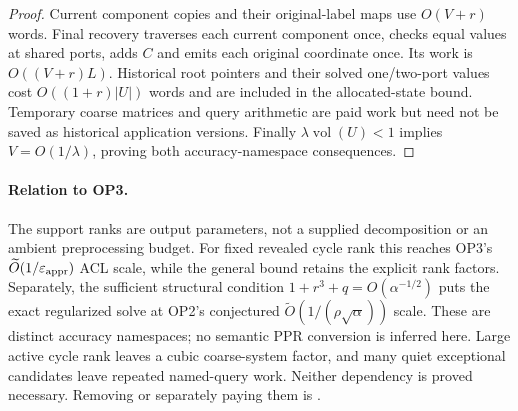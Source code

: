 \begin{proof}
Current component copies and their original-label maps use $O(V+r)$ words.
Final recovery traverses each current component once, checks equal values
at shared ports, adds $C$ and emits each original coordinate once. Its work
is $O((V+r)L)$. Historical root pointers and their solved one/two-port
values cost $O((1+r)|U|)$ words and are included in the allocated-state
bound. Temporary coarse matrices and query arithmetic are paid work but
need not be saved as historical application versions. Finally
$\lambda\operatorname{vol}(U)<1$ implies $V=O(1/\lambda)$, proving both
accuracy-namespace consequences.
\end{proof}

\paragraph{Relation to OP3.}
The support ranks are output parameters, not a supplied decomposition or an
ambient preprocessing budget. For fixed revealed cycle rank this reaches
OP3's $\widetilde O(1/\varepsilon_{\mathrm{appr}})$ ACL scale, while the general bound retains
the explicit rank factors. Separately, the sufficient structural condition
$1+r^3+q=O(\alpha^{-1/2})$ puts the exact regularized solve at OP2's
conjectured $\widetilde O(1/(\rho\sqrt\alpha))$ scale. These are distinct
accuracy namespaces; no semantic PPR conversion is inferred here.
Large active cycle rank leaves a cubic coarse-system factor, and many quiet
exceptional candidates leave repeated named-query work. Neither dependency
is proved necessary. Removing or separately paying them is \statusopen{}.

